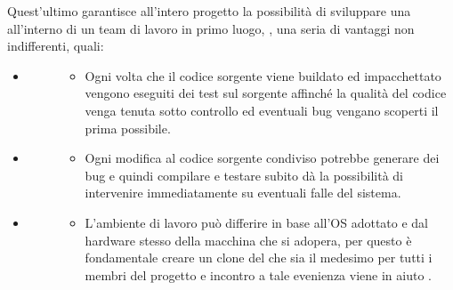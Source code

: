 \documentclass[letterpaper,10pt,italian,openany,oneside]{sphinxmanual}
\begin{document}
\noindent{}

Quest’ultimo garantisce all’intero progetto la possibilità di sviluppare una  all’interno di un team di lavoro in primo luogo, , una seria di vantaggi non indifferenti, quali:
\begin{itemize}
\item {} \begin{description}
\item[{}] \leavevmode\begin{itemize}
\item {} 
Ogni volta che il codice sorgente viene buildato ed impacchettato vengono eseguiti dei test sul sorgente affinché la qualità del codice venga tenuta sotto controllo ed eventuali bug vengano scoperti il prima possibile.

\end{itemize}

\end{description}

\item {} \begin{description}
\item[{}] \leavevmode\begin{itemize}
\item {} 
Ogni modifica al codice sorgente condiviso potrebbe generare dei bug e quindi compilare e testare subito dà la possibilità di intervenire immediatamente su eventuali falle del sistema.

\end{itemize}

\end{description}

\item {} \begin{description}
\item[{}] \leavevmode\begin{itemize}
\item {} 
L’ambiente di lavoro può differire in base all’OS adottato e dal hardware stesso della macchina che si adopera, per questo è fondamentale creare un clone del  che sia il medesimo per tutti i membri del progetto e incontro a tale evenienza viene in aiuto .


\end{itemize}
\end{description}
\end{itemize}
\end{document}
